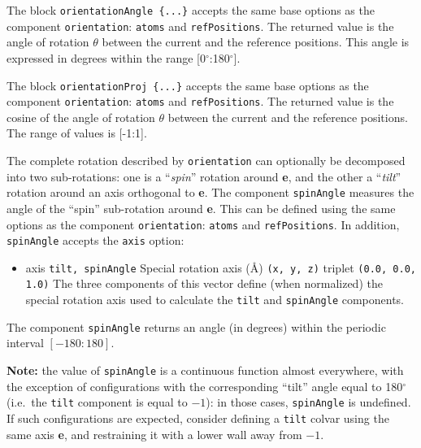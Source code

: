 The block \texttt{orientationAngle~\{...\}} accepts the same base options as
the component \texttt{orientation}: \texttt{atoms} and \texttt{refPositions}.
The returned value is the angle of rotation $\theta$ between the current and the reference positions.
This angle is expressed in degrees within the range [0$^{\circ}$:180$^{\circ}$].


The block \texttt{orientationProj~\{...\}} accepts the same base options as
the component \texttt{orientation}: \texttt{atoms} and \texttt{refPositions}.
The returned value is the cosine of the angle of rotation $\theta$ between the current and the reference positions.
The range of values is [-1:1].


The complete rotation described by \texttt{orientation} can optionally be decomposed into two sub-rotations: one is a ``\emph{spin}'' rotation around \textbf{e}, and the other a ``\emph{tilt}'' rotation around an axis orthogonal to \textbf{e}.
The component \texttt{spinAngle} measures the angle of the ``spin'' sub-rotation around \textbf{e}.
This can be defined using the same options as the component \texttt{orientation}: \texttt{atoms} and \texttt{refPositions}.
In addition, \texttt{spinAngle} accepts the \texttt{axis} option:
\begin{itemize}
\item %
  \keydef
    {axis}{%
    \texttt{tilt, spinAngle}}{%
    Special rotation axis (\AA{})}{%
    \texttt{(x, y, z)} triplet}{%
    \texttt{(0.0, 0.0, 1.0)}}{%
    The three components of this vector define (when normalized) the special rotation axis used to calculate the \texttt{tilt} and \texttt{spinAngle} components.}
\end{itemize}
The component \texttt{spinAngle} returns an angle (in degrees) within the periodic interval $[-180:180]$.  

\textbf{Note:} the value of \texttt{spinAngle} is a continuous function almost everywhere, with the exception of configurations with the corresponding ``tilt'' angle equal to 180$^\circ$ (i.e.~the \texttt{tilt} component is equal to $-1$): in those cases, \texttt{spinAngle} is undefined.  If such configurations are expected, consider defining a \texttt{tilt} colvar using the same axis \textbf{e}, and restraining it with a lower wall away from $-1$.


